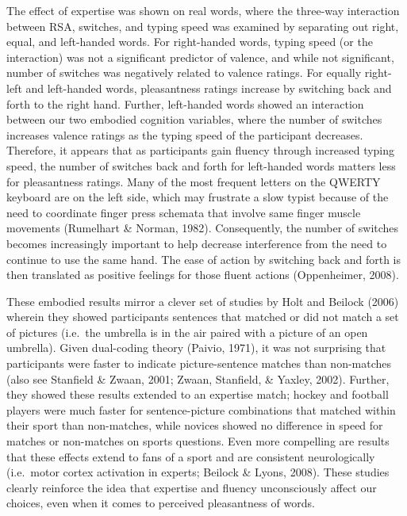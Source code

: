 \documentclass[english,man]{apa6}
\theoremstyle{definition}
\theoremstyle{definition}
\theoremstyle{definition}
\theoremstyle{remark}
\begin{document}
The effect of expertise was shown on real words, where the three-way
interaction between RSA, switches, and typing speed was examined by
separating out right, equal, and left-handed words. For right-handed
words, typing speed (or the interaction) was not a significant predictor
of valence, and while not significant, number of switches was negatively
related to valence ratings. For equally right-left and left-handed
words, pleasantness ratings increase by switching back and forth to the
right hand. Further, left-handed words showed an interaction between our
two embodied cognition variables, where the number of switches increases
valence ratings as the typing speed of the participant decreases.
Therefore, it appears that as participants gain fluency through
increased typing speed, the number of switches back and forth for
left-handed words matters less for pleasantness ratings. Many of the
most frequent letters on the QWERTY keyboard are on the left side, which
may frustrate a slow typist because of the need to coordinate finger
press schemata that involve same finger muscle movements (Rumelhart \&
Norman, 1982). Consequently, the number of switches becomes increasingly
important to help decrease interference from the need to continue to use
the same hand. The ease of action by switching back and forth is then
translated as positive feelings for those fluent actions (Oppenheimer,
2008).

These embodied results mirror a clever set of studies by Holt and
Beilock (2006) wherein they showed participants sentences that matched
or did not match a set of pictures (i.e.~the umbrella is in the air
paired with a picture of an open umbrella). Given dual-coding theory
(Paivio, 1971), it was not surprising that participants were faster to
indicate picture-sentence matches than non-matches (also see Stanfield
\& Zwaan, 2001; Zwaan, Stanfield, \& Yaxley, 2002). Further, they showed
these results extended to an expertise match; hockey and football
players were much faster for sentence-picture combinations that matched
within their sport than non-matches, while novices showed no difference
in speed for matches or non-matches on sports questions. Even more
compelling are results that these effects extend to fans of a sport and
are consistent neurologically (i.e.~motor cortex activation in experts;
Beilock \& Lyons, 2008). These studies clearly reinforce the idea that
expertise and fluency unconsciously affect our choices, even when it
comes to perceived pleasantness of words.
\end{document}
